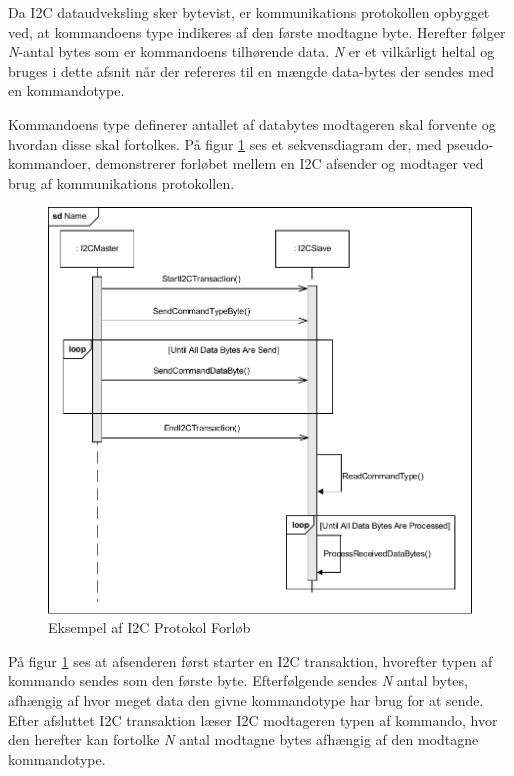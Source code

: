 Da I2C dataudveksling sker bytevist, er kommunikations protokollen opbygget ved, at kommandoens type indikeres af den første modtagne byte. Herefter følger \textit{N}-antal bytes som er kommandoens tilhørende data. \textit{N} er et vilkårligt heltal og bruges i dette afsnit når der refereres til en mængde data-bytes der sendes med en kommandotype.

Kommandoens type definerer antallet af databytes modtageren skal forvente og hvordan disse skal fortolkes. På figur \ref{fig:I2CProtokolEksempel} ses et sekvensdiagram der, med pseudo-kommandoer, demonstrerer forløbet mellem en I2C afsender og modtager ved brug af kommunikations protokollen.

\begin{figure}[H]
	\centering
	\includegraphics[width=\textwidth] {Systemarkitektur/images/I2CProtocol}
	\caption{Eksempel af I2C Protokol Forløb}
	\label{fig:I2CProtokolEksempel}
\end{figure}

På figur \ref{fig:I2CProtokolEksempel} ses at afsenderen først starter en I2C transaktion, hvorefter typen af kommando sendes som den første byte. Efterfølgende sendes \textit{N} antal bytes, afhængig af hvor meget data den givne kommandotype har brug for at sende. Efter afsluttet I2C transaktion læser I2C modtageren typen af kommando, hvor den herefter kan fortolke \textit{N} antal modtagne bytes afhængig af den modtagne kommandotype.

